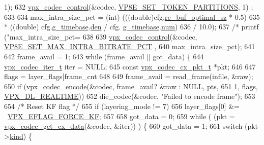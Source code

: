 \begin{DoxyCodeInclude}
{{{{{{{{{{{{{{{{{{       1);
632     \hyperlink{group__codec_gac1b91e04698c1bd4c0a2b8aa85b08cd2}{vpx\_codec\_control}(&codec, \hyperlink{group__vp8__encoder_gga6deae3d561c838952552c3d3756322eca462a4f14f39a6eb5c4a4004fc8d0ad75}{VP8E\_SET\_TOKEN\_PARTITIONS},       1)
      ;
633 
634     max\_intra\_size\_pct = (int) (((\textcolor{keywordtype}{double})cfg.\hyperlink{structvpx__codec__enc__cfg_aafde485867e040a58504ad796e79e47f}{rc\_buf\_optimal\_sz} * 0.5)
635                          * ((double) cfg.\hyperlink{structvpx__codec__enc__cfg_a6498d378e4c29ef3e22258289e481087}{g\_timebase}.\hyperlink{structvpx__rational_a29dd2ab4001377b3aa21885ef969759f}{den} / cfg.
      \hyperlink{structvpx__codec__enc__cfg_a6498d378e4c29ef3e22258289e481087}{g\_timebase}.\hyperlink{structvpx__rational_ae7774f21a22c9bef3aa73156c79f4731}{num})
636                          / 10.0);
637     \textcolor{comment}{/* printf ("max\_intra\_size\_pct=%
638 
639     \hyperlink{group__codec_gac1b91e04698c1bd4c0a2b8aa85b08cd2}{vpx\_codec\_control}(&codec, \hyperlink{group__vp8__encoder_gga6deae3d561c838952552c3d3756322eca09c69ff4a3aabdb307d4f24027dfc4c1}{VP8E\_SET\_MAX\_INTRA\_BITRATE\_PCT}
      ,
640                       max\_intra\_size\_pct);
641 
642     frame\_avail = 1;
643     \textcolor{keywordflow}{while} (frame\_avail || got\_data) \{
644         \hyperlink{group__codec_ga6ea348f76b1f8a1fe50e14db684146c6}{vpx\_codec\_iter\_t} iter = NULL;
645         \textcolor{keyword}{const} \hyperlink{structvpx__codec__cx__pkt}{vpx\_codec\_cx\_pkt\_t} *pkt;
646 
647         flags = layer\_flags[frame\_cnt %
648 
649         frame\_avail = read\_frame(infile, &raw);
650         \textcolor{keywordflow}{if} (\hyperlink{group__encoder_gaf990542e2aeb389f05fae3e9c7803639}{vpx\_codec\_encode}(&codec, frame\_avail? &raw : NULL, pts,
651                             1, flags, \hyperlink{group__encoder_ga04253cc9ec1146d72fa8bb86bcf32144}{VPX\_DL\_REALTIME}))
652             die\_codec(&codec, \textcolor{stringliteral}{"Failed to encode frame"});
653 
654         \textcolor{comment}{/* Reset KF flag */}
655         \textcolor{keywordflow}{if} (layering\_mode != 7)
656             layer\_flags[0] &= ~\hyperlink{group__encoder_ga4c4f4e3cbb5225d2c6c050e2d1e948fa}{VPX\_EFLAG\_FORCE\_KF};
657 
658         got\_data = 0;
659         \textcolor{keywordflow}{while} ( (pkt = \hyperlink{group__encoder_gae81cab25d66cf3bc59f1f75f8a5af720}{vpx\_codec\_get\_cx\_data}(&codec, &iter)) ) \{
660             got\_data = 1;
661             \textcolor{keywordflow}{switch} (pkt->\hyperlink{structvpx__codec__cx__pkt_a41f395b39516343c1329a4a85a0084f2}{kind}) \{
}}}}}}}}}}}}}}}}}}}
\end{DoxyCodeInclude}
